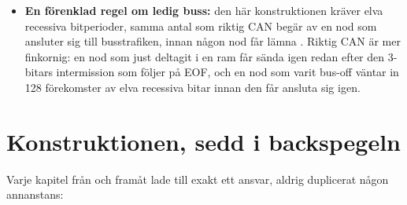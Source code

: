 \begin{itemize}
    att sömlöst fortsätta ta emot den ram som vann; en riktig nod fortsätter ta emot oavsett vem som
    vann bussen. Den här konstruktionens nod väntar ut resten av ramen i 
    () och tar vid från nästa.
  \item \textbf{En förenklad regel om ledig buss:} den här konstruktionen kräver elva recessiva
    bitperioder, samma antal som riktig CAN begär av en nod som ansluter sig till busstrafiken, innan
    någon nod får lämna . Riktig CAN är mer finkornig: en nod som just deltagit i en
    ram får sända igen redan efter den 3-bitars intermission som följer på EOF, och en nod som varit
    bus-off väntar in 128 förekomster av elva recessiva bitar innan den får ansluta sig igen.
\end{itemize}

\section{Konstruktionen, sedd i backspegeln}
\label{c19:sec:review-design}

Varje kapitel från  och framåt lade till exakt ett ansvar, aldrig duplicerat någon
annanstans:

